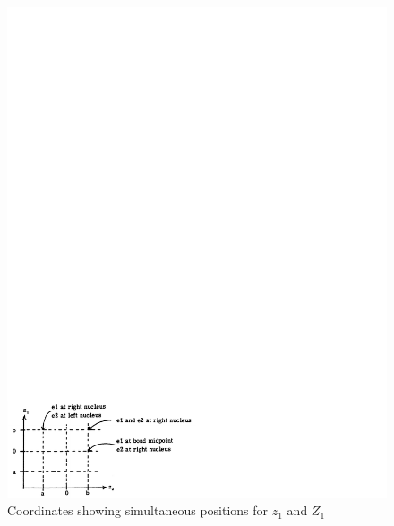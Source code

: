 \begin{figure}
\begin{center}
\includegraphics[scale=0.75]{fig2-19}
\end{center}
\caption{Coordinates showing simultaneous positions for $z_1$ and $Z_1$}
\label{fig2-19}
\end{figure}

